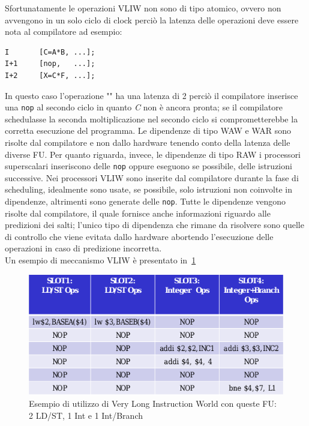 Sfortunatamente le operazioni VLIW non sono di tipo atomico, ovvero non avvengono in un solo ciclo di clock perciò la latenza delle operazioni deve essere nota al compilatore ad esempio:
\begin{verbatim}
I		[C=A*B, ...];
I+1		[nop,   ...];
I+2		[X=C*F, ...];
\end{verbatim}
In questo caso l'operazione "\*" ha una latenza di 2 perciò il compilatore inserisce una \texttt{nop} al secondo ciclo in quanto \emph{C} non è ancora pronta; se il compilatore schedulasse la seconda moltiplicazione nel secondo ciclo si comprometterebbe la corretta esecuzione del programma. Le dipendenze di tipo WAW e WAR sono risolte dal compilatore e non dallo hardware tenendo conto della latenza delle diverse FU. Per quanto riguarda, invece, le dipendenze di tipo RAW i processori superscalari inseriscono delle \texttt{nop} oppure eseguono se possibile, delle istruzioni successive. Nei processori VLIW  sono inserite dal compilatore durante la fase di scheduling, idealmente sono usate, se possibile, solo istruzioni non coinvolte in dipendenze, altrimenti sono generate delle \texttt{nop}. Tutte le dipendenze vengono risolte dal compilatore, il quale fornisce anche informazioni riguardo alle predizioni dei salti; l'unico tipo di dipendenza che rimane da risolvere sono quelle di controllo che viene evitata dallo hardware abortendo l'esecuzione delle operazioni in caso di predizione incorretta.\\
Un esempio di meccanismo VLIW è presentato in \figurename\,\ref{fig:VLIWexemp}
\begin{figure}[htb]
\centering
\includegraphics[scale=0.5]{img/vliwexemp.png}
\caption{Esempio di utilizzo di Very Long Instruction World con queste FU: 2 LD/ST, 1 Int e 1 Int/Branch}\label{fig:VLIWexemp}
\end{figure}
